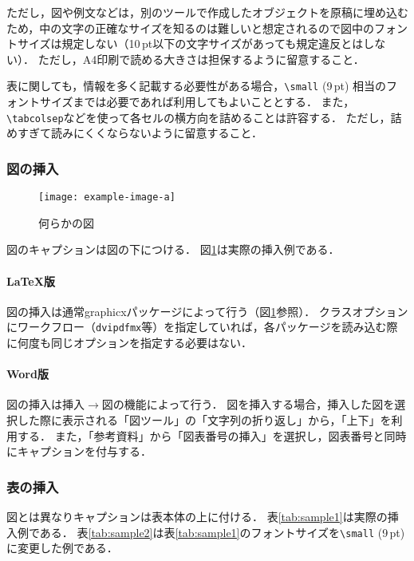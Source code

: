 \documentclass[
  platex, dvipdfmx,  %
]{nlp2024}
\newcommand{\pkg}[1]{\textsf{#1}}
\newcommand{\code}[1]{\texttt{#1}}
\begin{document}
ただし，図や例文などは，別のツールで作成したオブジェクトを原稿に埋め込むため，中の文字の正確なサイズを知るのは難しいと想定されるので図中のフォントサイズは規定しない（10\,pt以下の文字サイズがあっても規定違反とはしない）．
ただし，A4印刷で読める大きさは担保するように留意すること．

表に関しても，情報を多く記載する必要性がある場合，\verb|\small| (9\,pt) 相当のフォントサイズまでは必要であれば利用してもよいこととする．
また，\verb|\tabcolsep|などを使って各セルの横方向を詰めることは許容する．
ただし，詰めすぎて読みにくくならないように留意すること．


\subsubsection{図の挿入}
%
\begin{figure}[t]
\centering
\texttt{[image: example-image-a]}
\caption{何らかの図}
\label{fig:sample}
\end{figure}

図のキャプションは図の下につける．
図\ref{fig:sample}は実際の挿入例である．


\paragraph{LaTeX版}
図の挿入は通常\pkg{graphicx}パッケージによって行う（図\ref{fig:sample}参照）．
クラスオプションにワークフロー（\code{dvipdfmx}等）を指定していれば，各パッケージを読み込む際に何度も同じオプションを指定する必要はない．


\paragraph{Word版}
図の挿入は挿入$\xrightarrow{}$図の機能によって行う．
図を挿入する場合，挿入した図を選択した際に表示される「図ツール」の「文字列の折り返し」から，「上下」を利用する．
また，「参考資料」から「図表番号の挿入」を選択し，図表番号と同時にキャプションを付与する．



\subsubsection{表の挿入}
図とは異なりキャプションは表本体の上に付ける．
表\ref{tab:sample1}は実際の挿入例である．
表\ref{tab:sample2}は表\ref{tab:sample1}のフォントサイズを\verb|\small| (9\,pt) に変更した例である．
\end{document}
